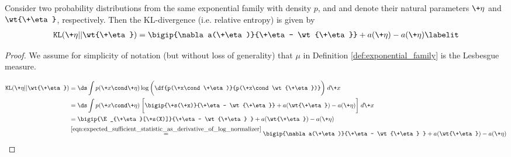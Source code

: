\documentclass{article} %
\newcommand{\obs}{\+x}
\newcommand{\logNormalizerFunction}{a}
\newcommand{\sufficientStatsFunction}{\+s}
\newcommand{\naturalParam}{\+\eta}
\begin{document}
\begin{proposition}
Consider two probability distributions from the same exponential family with density $p$, and and denote their natural  parameters $\naturalParam$ and $\wt{\naturalParam}$, respectively.  Then the KL-divergence (i.e. relative entropy) is given by
\begin{align*}
\texttt{KL}(\naturalParam || \wt{\naturalParam}) = \bigip{\nabla \logNormalizerFunction(\naturalParam)}{\naturalParam - \wt{\naturalParam}} + \logNormalizerFunction(\naturalParam) - \logNormalizerFunction(\naturalParam) 
\labelit \label{eqn:KL_divergence_between_two_members_of_the_sample_exponential_family}
\end{align*}
 


\begin{proof}
We assume for simplicity of notation (but without loss of generality) that $\mu$ in Definition \ref{def:exponential_family} is the Lesbesgue measure. 

\begin{align*}
\texttt{KL}(\naturalParam || \wt{\naturalParam}) &= \ds\int p(\obs \cond \naturalParam) \log \bigg( \df{p(\obs \cond \naturalParam)}{p(\obs \cond \wt{\naturalParam})}\bigg) \;d\obs \\ 
& = \ds\int p(\obs \cond \naturalParam) \; \bigg[ \bigip{\sufficientStatsFunction(\obs)}{\naturalParam - \wt{\naturalParam}}  + \logNormalizerFunction(\wt{\naturalParam}) - \logNormalizerFunction(\naturalParam) \bigg] \; d\obs \\
&= \bigip{\E_{\naturalParam}[\sufficientStatsFunction(X)]}{\naturalParam - \wt{\naturalParam} } + \logNormalizerFunction(\wt{\naturalParam}) - \logNormalizerFunction(\naturalParam) \\
& \stackrel{\eqref{eqn:expected_sufficient_statistic_as_derivative_of_log_normalizer}}{=}  \bigip{\nabla \logNormalizerFunction(\naturalParam)}{\naturalParam - \wt{\naturalParam} } + \logNormalizerFunction(\wt{\naturalParam}) - \logNormalizerFunction(\naturalParam)
\end{align*}
	
\end{proof}
\label{prop:kl_divergence_between_members_of_same_exponential_family}
\end{proposition}
\end{document}
